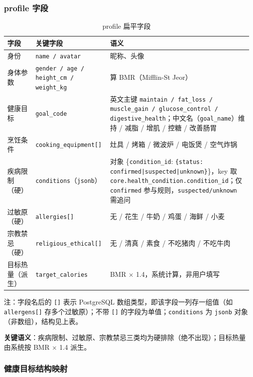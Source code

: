 \documentclass[12pt,a4paper]{ctexart}
\begin{document}
\subsubsection{profile 字段}
\vspace{-1em}
\begin{xltabular}{\linewidth}{Q{3.2cm}Q{4cm}L}
\caption{profile 扁平字段} \\
\toprule
\textbf{字段} & \textbf{关键字段} & \textbf{语义} \\
\midrule
\endhead
身份 & \texttt{name / avatar} & 昵称、头像 \\
身体参数 & \texttt{gender / age / height\_cm / weight\_kg} & 算 BMR（Mifflin-St Jeor） \\
健康目标 & \texttt{goal\_code} & 英文主键 \texttt{maintain / fat\_loss / muscle\_gain / glucose\_control / digestive\_health}；中文名（\texttt{goal\_name}）维持 / 减脂 / 增肌 / 控糖 / 改善肠胃 \\
烹饪条件 & \texttt{cooking\_equipment[]} & 灶具 / 烤箱 / 微波炉 / 电饭煲 / 空气炸锅 \\
疾病限制（硬） & \texttt{conditions}（\texttt{jsonb}） & 对象 \{\texttt{condition\_id}: \texttt{\{status: confirmed|suspected|unknown\}}\}，key 取 \texttt{core.health\_condition.condition\_id}；仅 \texttt{confirmed} 参与规则，\texttt{suspected/unknown} 需追问 \\
过敏原（硬） & \texttt{allergies[]} & 无 / 花生 / 牛奶 / 鸡蛋 / 海鲜 / 小麦 \\
宗教禁忌（硬） & \texttt{religious\_ethical[]} & 无 / 清真 / 素食 / 不吃猪肉 / 不吃牛肉 \\
目标热量（派生） & \texttt{target\_calories} & BMR $\times$ 1.4，系统计算，非用户填写 \\
\bottomrule
\end{xltabular}

{\footnotesize 注：字段名后的 \texttt{[]} 表示 PostgreSQL 数组类型，即该字段一列存一组值（如 \texttt{allergens[]} 存多个过敏原）；不带 \texttt{[]} 的字段为单值；\texttt{conditions} 为 \texttt{jsonb} 对象（非数组），结构见上表。}

\textbf{关键语义}：疾病限制、过敏原、宗教禁忌三类均为硬排除（绝不出现）；目标热量由系统按 BMR $\times$ 1.4 派生。

\subsubsection{健康目标结构映射}
\end{document}
